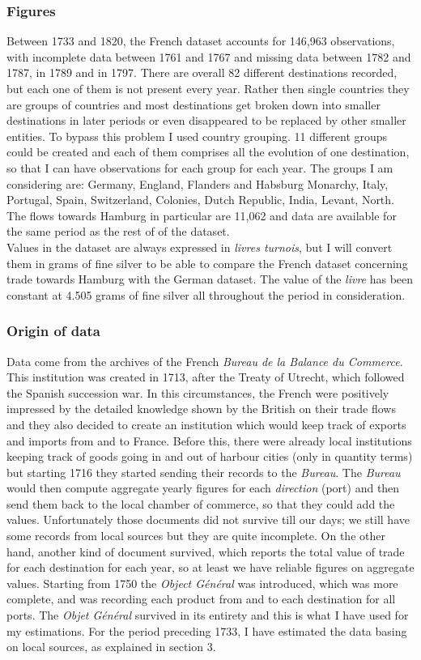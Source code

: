 \documentclass[12pt,a4paper,titlepage,english]{article}
\begin{document}
\subsubsection{Figures}
Between 1733 and 1820, the French dataset accounts for 146,963 observations, with incomplete data between 1761 and 1767 and missing data between 1782 and 1787, in 1789 and in 1797. There are overall 82 different destinations recorded, but each one of them is not present every year. Rather then single countries they are groups of countries and most destinations get broken down into smaller destinations in later periods or even disappeared to be replaced by other smaller entities. To bypass this problem I used country grouping. 11 different groups could be created and each of them comprises all the evolution of one destination, so that I can have observations for each group for each year. The groups I am considering are: Germany, England, Flanders and Habsburg Monarchy, Italy, Portugal, Spain, Switzerland, Colonies, Dutch Republic, India, Levant, North. The flows towards Hamburg in particular are 11,062 and data are available for the same period as the rest of of the dataset.\\
Values in the dataset are always expressed in \textit{livres turnois}, but I will convert them in grams of fine silver to be able to compare the French dataset concerning trade towards Hamburg with the German dataset. The value of the \textit{livre} has been constant at 4.505 grams of fine silver all throughout the period in consideration. 

\subsubsection{Origin of data}
Data come from the archives of the French \textit{Bureau de la Balance du Commerce}. This institution was created in 1713, after the Treaty of Utrecht, which followed the Spanish succession war. In this circumstances, the French were positively impressed by the detailed knowledge shown by the British on their trade flows and they also decided to create an institution which would keep track of exports and imports from and to France. Before this, there were already local institutions keeping track of goods going in and out of harbour cities (only in quantity terms) but starting 1716 they started sending their records to the \textit{Bureau}. The \textit{Bureau} would then compute aggregate yearly figures for each \textit{direction} (port) and then send them back to the local chamber of commerce, so that they could add the values. Unfortunately those documents did not survive till our days; we still have some records from local sources but they are quite incomplete. On the other hand, another kind of document survived, which reports the total value of trade for each destination for each year, so at least we have reliable figures on aggregate values. Starting from 1750 the \textit{Object Général} was introduced, which was more complete, and was recording each product from and to each destination for all ports. The \textit{Objet Général} survived in its entirety and this is what I have used for my estimations. For the period preceding 1733, I have estimated the data basing on local sources, as explained in section 3. 
\end{document}
